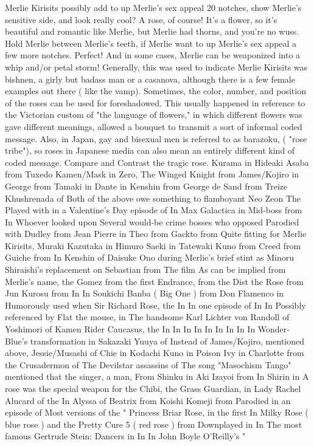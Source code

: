 \documentclass[12pt]{book}
\begin{document}
Merlie Kirisits possibly add to up Merlie's sex appeal 20 notches, show Merlie's sensitive side, and look really cool? A rose, of course! It's a flower, so it's beautiful and romantic like Merlie, but Merlie had thorns, and you're no wuss. Hold Merlie between Merlie's teeth, if Merlie want to up Merlie's sex appeal a few more notches. Perfect! And in some cases, Merlie can be weaponized into a whip and/or petal storm! Generally, this was used to indicate Merlie Kirisits was bishnen, a girly but badass man or a casanova, although there is a few female examples out there ( like the vamp). Sometimes, the color, number, and position of the roses can be used for foreshadowed. This usually happened in reference to the Victorian custom of "the language of flowers," in which different flowers was gave different meanings, allowed a bouquet to transmit a sort of informal coded message. Also, in Japan, gay and bisexual men is referred to as barazoku, ( "rose tribe"), so roses in Japanese media can also mean an entirely different kind of coded message. Compare and Contrast the tragic rose. Kurama in Hideaki Asaba from Tuxedo Kamen/Mask in Zero, The Winged Knight from James/Kojiro in George from Tamaki in Dante in Kenshin from George de Sand from Treize Khushrenada of Both of the above owe something to flamboyant Neo Zeon The Played with in a Valentine's Day episode of In Max Galactica in Mid-boss from In Whoever looked upon Several would-be crime bosses who opposed Parodied with Dudley from Jean Pierre in Theo from Gackto from Quite fitting for Merlie Kirisits, Muraki Kazutaka in Himuro Saeki in Tatewaki Kuno from Creed from Guiche from In Kenshin of Daisuke Ono during Merlie's brief stint as Minoru Shiraishi's replacement on Sebastian from The film As can be implied from Merlie's name, the Gomez from the first Endrance, from the Dist the Rose from Jun Kurosu from In In Soukichi Banba ( Big One ) from Don Flamenco in Humorously used when Sir Richard Rose, the In In one episode of In In Possibly referenced by Flat the mouse, in The handsome Karl Lichter von Randoll of Yoshimori of Kamen Rider Caucasus, the In In In In In In In In In Wonder-Blue's transformation in Sakazaki Yuuya of Instead of James/Kojiro, mentioned above, Jessie/Musashi of Chie in Kodachi Kuno in Poison Ivy in Charlotte from the Crusadermon of The Devilstar assassins of The song "Masochism Tango" mentioned that the singer, a man, From Shinku in Aki Izayoi from In Shirin in A rose was the special weapon for the Chibi, the Grass Guardian, in Lady Rachel Alucard of the In Alyssa of Beatrix from Koishi Komeji from Parodied in an episode of Most versions of the " Princess Briar Rose, in the first In Milky Rose ( blue rose ) and the Pretty Cure 5 ( red rose ) from Downplayed in In The most famous Gertrude Stein: Dancers in In In John Boyle O'Reilly's "
\end{document}
